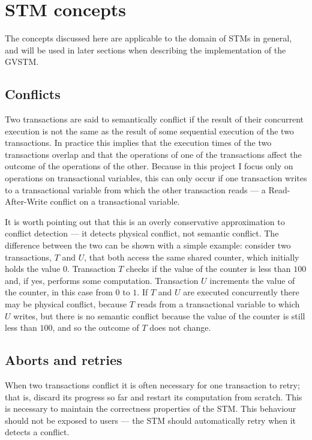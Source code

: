 \documentclass[12pt,a4paper,oneside,openright]{report}
\begin{document}
\section{STM concepts}
\label{sec:stm-concepts}

The concepts discussed here are applicable to the domain of STMs in
general, and will be used in later sections when describing the
implementation of the GVSTM.

\subsection{Conflicts}
\label{sec:impl:conflicts}

Two transactions are said to semantically conflict if the result of
their concurrent execution is not the same as the result of some
sequential execution of the two transactions. In practice this implies
that the execution times of the two transactions overlap and that the
operations of one of the transactions affect the outcome of the
operations of the other. Because in this project I focus only on
operations on transactional variables, this can only occur if one
transaction writes to a transactional variable from which the other
transaction reads --- a Read-After-Write conflict on a transactional
variable.

It is worth pointing out that this is an overly conservative
approximation to conflict detection --- it detects physical conflict,
not semantic conflict. The difference between the two can be shown
with a simple example: consider two transactions, $T$ and $U$, that
both access the same shared counter, which initially holds the value
$0$. Transaction $T$ checks if the value of the counter is less than
$100$ and, if yes, performs some computation. Transaction $U$
increments the value of the counter, in this case from $0$ to $1$. If
$T$ and $U$ are executed concurrently there may be physical conflict,
because $T$ reads from a transactional variable to which $U$ writes,
but there is no semantic conflict because the value of the counter is
still less than $100$, and so the outcome of $T$ does not change.

\subsection{Aborts and retries}
\label{sec:aborts-using-panics}

When two transactions conflict it is often necessary for one
transaction to retry; that is, discard its progress so far and restart
its computation from scratch. This is necessary to maintain the
correctness properties of the STM. This behaviour should not be
exposed to users --- the STM should automatically retry when it
detects a conflict.
\end{document}
